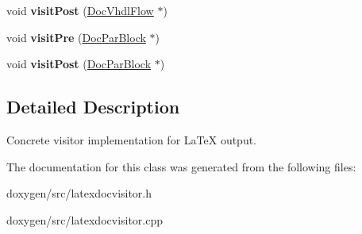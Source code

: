 \begin{DoxyCompactItemize}
\mbox{\label{class_latex_doc_visitor_a3353f7b7acca94ca4a604cf4192a880d}} 
void {\bfseries visit\+Post} (\mbox{\hyperlink{class_doc_vhdl_flow}{Doc\+Vhdl\+Flow}} $\ast$)
\item 
\mbox{\label{class_latex_doc_visitor_a663576b832d9f14635490ac680471ccb}} 
void {\bfseries visit\+Pre} (\mbox{\hyperlink{class_doc_par_block}{Doc\+Par\+Block}} $\ast$)
\item 
\mbox{\label{class_latex_doc_visitor_a71f56c235067a09f2a7eb82f054d6b90}} 
void {\bfseries visit\+Post} (\mbox{\hyperlink{class_doc_par_block}{Doc\+Par\+Block}} $\ast$)
\end{DoxyCompactItemize}


\subsection{Detailed Description}
Concrete visitor implementation for La\+TeX output. 

The documentation for this class was generated from the following files\+:\begin{DoxyCompactItemize}
\item 
doxygen/src/latexdocvisitor.\+h\item 
doxygen/src/latexdocvisitor.\+cpp\end{DoxyCompactItemize}
